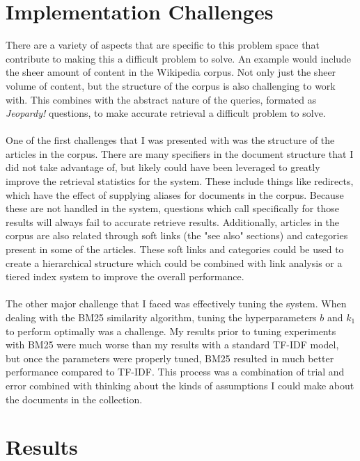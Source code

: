 \documentclass{article}%
\begin{document}
\section*{Implementation Challenges}
There are a variety of aspects that are specific to this problem space that contribute to making this a difficult problem to solve. An
example would include the sheer amount of content in the Wikipedia corpus. Not only just the sheer volume of content, but the structure
of the corpus is also challenging to work with. This combines with the abstract nature of the queries, formated as \textit{Jeopardy!}
questions, to make accurate retrieval a difficult problem to solve.\\
\\
One of the first challenges that I was presented with was the structure of the articles in the corpus. There are many specifiers in the
document structure that I did not take advantage of, but likely could have been leveraged to greatly improve the retrieval statistics
for the system. These include things like redirects, which have the effect of supplying aliases for documents in the corpus. Because
these are not handled in the system, questions which call specifically for those results will always fail to accurate retrieve
results. Additionally, articles in the corpus are also related through soft links (the "see also" sections) and categories present
in some of the articles. These soft links and categories could be used to create a hierarchical structure which could be combined
with link analysis or a tiered index system to improve the overall performance.\\
\\
The other major challenge that I faced was effectively tuning the system. When dealing with the BM25 similarity algorithm, tuning the
hyperparameters $b$ and $k_1$ to perform optimally was a challenge. My results prior to tuning experiments with BM25 were much worse than
my results with a standard TF-IDF model, but once the parameters were properly tuned, BM25 resulted in much better performance compared
to TF-IDF. This process was a combination of trial and error combined with thinking about the kinds of assumptions I could make about
the documents in the collection.

\section*{Results}
\end{document}
